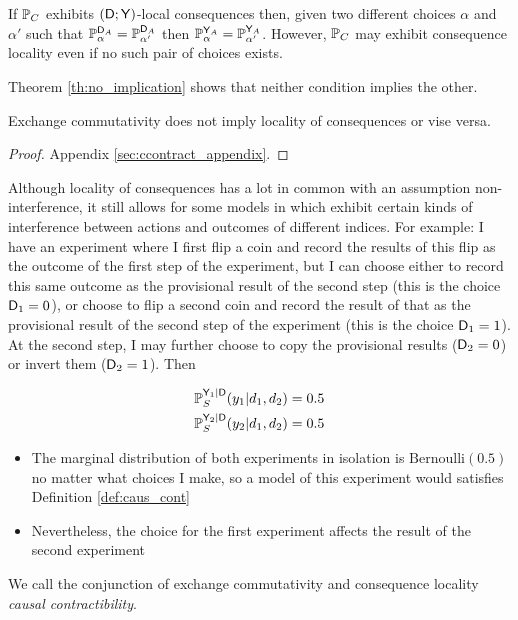 If $\mathbb{P}_C$ exhibits $(\mathsf{D};\mathsf{Y})$-local consequences then, given two different choices $\alpha$ and $\alpha'$ such that $\mathbb{P}_\alpha^{\mathsf{D}_A}=\mathbb{P}_{\alpha'}^{\mathsf{D}_A}$ then $\mathbb{P}_\alpha^{\mathsf{Y}_A}=\mathbb{P}_{\alpha'}^{\mathsf{Y}_A}$. However, $\mathbb{P}_C$ may exhibit consequence locality even if no such pair of choices exists.

Theorem \ref{th:no_implication} shows that neither condition implies the other. 

\begin{theorem}\label{th:no_implication}
Exchange commutativity does not imply locality of consequences or vise versa.
\end{theorem}

\begin{proof}
Appendix \ref{sec:ccontract_appendix}.
\end{proof}

Although locality of consequences has a lot in common with an assumption non-interference, it still allows for some models in which exhibit certain kinds of interference between actions and outcomes of different indices. For example: I have an experiment where I first flip a coin and record the results of this flip as the outcome of the first step of the experiment, but I can choose either to record this same outcome as the provisional result of the second step (this is the choice $\mathsf{D}_1=0$), or choose to flip a second coin and record the result of that as the provisional result of the second step of the experiment (this is the choice $\mathsf{D}_1=1$). At the second step, I may further choose to copy the provisional results ($\mathsf{D}_2=0$) or invert them ($\mathsf{D}_2=1$). Then

\begin{align}
    \mathbb{P}_S^{\mathsf{Y}_1|\mathsf{D}}(y_1|d_1,d_2) &= 0.5\\
    \mathbb{P}_S^{\mathsf{Y}_2|\mathsf{D}}(y_2|d_1,d_2) &= 0.5
\end{align}
\begin{itemize}
    \item The marginal distribution of both experiments in isolation is $\text{Bernoulli}(0.5)$ no matter what choices I make, so a model of this experiment would satisfies Definition \ref{def:caus_cont}
    \item Nevertheless, the choice for the first experiment affects the result of the second experiment
\end{itemize}

We call the conjunction of exchange commutativity and consequence locality \emph{causal contractibility}.

